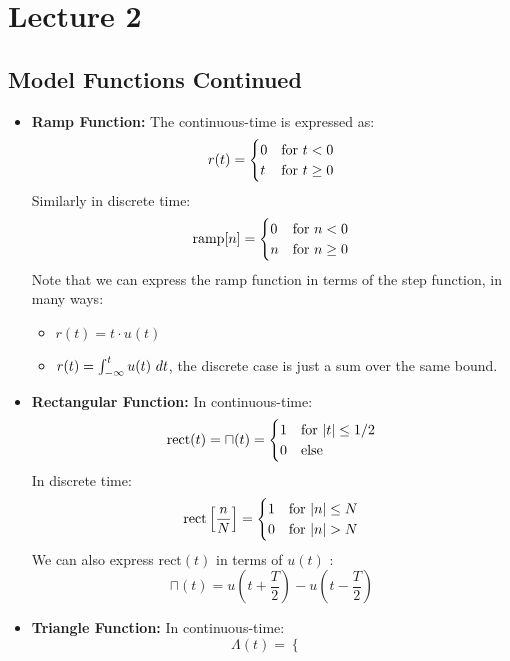 \section{Lecture 2}
\subsection{Model Functions Continued}
\begin{itemize}
	\item \textbf{Ramp Function:} The continuous-time is expressed as:
		\[
		r(t) = \begin{cases}
			0 & \text{for \( t < 0 \)}\\
			t & \text{for \( t \ge 0 \)}
		\end{cases}
		\] 
		Similarly in discrete time:
		\[
			\text{ramp}[n] = \begin{cases}
				0 & \text{for \( n < 0 \)}\\
				n & \text{for \( n \ge 0 \)}
			\end{cases}
		\] 
		Note that we can express the ramp function in terms of the step function, in many ways:
		\begin{itemize}
			\item \( r(t) = t \cdot u(t) \)
			\item \( r(t) = \int_{-\infty}^{t}u(t) \ d t \), the discrete case is just a sum over the same bound.
		\end{itemize}
	\item \textbf{Rectangular Function:} In continuous-time:
		\[
		\text{rect}(t) = \sqcap(t) = \begin{cases}
			1 & \text{for \( |t| \le  1 / 2 \)}\\
			0 & \text{else}
		\end{cases}
		\] 
		In discrete time:
		\[
		\text{rect}\left[ \frac{n}{N} \right] = \begin{cases}
			1 & \text{for \( |n| \le  N \)}\\
			0 & \text{for \( |n| > N \)}
		\end{cases}
		\] 
		We can also express \( \text{rect}(t) \) in terms of \( u(t) \) :
		\[
			\sqcap(t) = u\left( t + \frac{T}{2} \right)	- u\left( t - \frac{T}{2} \right) 
		\] 
	\item \textbf{Triangle Function:} In continuous-time:
		\[
		\Lambda(t) = \begin{cases}

\end{cases}\]
\end{itemize}

